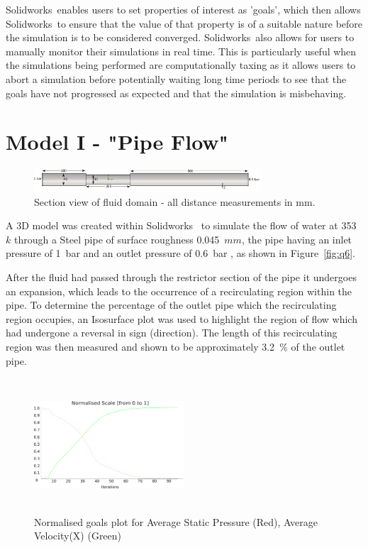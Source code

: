 \documentclass[a4paper,11pt,onecolumn]{article}
\begin{document}
Solidworks\textregistered~enables users to set properties of interest as
'goals', which then allows Solidworks\textregistered~to ensure that the value
of
that property is of a suitable nature before the simulation is to be considered
converged. Solidworks\textregistered~also allows for users to manually monitor
their simulations in real time. This is particularly useful when the
simulations being performed are computationally taxing as it allows users to
abort a simulation before potentially waiting long time periods to see that the
goals have not progressed as expected and that the simulation is misbehaving. 
\section{Model I - "Pipe Flow"}

\begin{figure}[ht!]
\centering
    	\includegraphics[width=0.75\textwidth]{q6.pdf}
    	\caption{Section view of fluid domain - all distance measurements in mm.}
\label{fig:q6}
\end{figure}
A 3D model was created within Solidworks\textregistered~ to simulate the flow
of water at 353~$k$ through a Steel pipe of surface roughness 0.045~$mm$, the
pipe having an inlet pressure of 1~bar and an outlet pressure of 0.6~bar , as
shown in Figure~\vref{fig:q6}.


After the fluid had passed through the restrictor section of the pipe it
undergoes an expansion, which leads to the occurrence of a recirculating region
within the pipe. To determine the percentage of the
outlet pipe which the recirculating region occupies, an Isosurface plot was
used to highlight the region of flow which had undergone a reversal in
sign (direction). The length of this recirculating region was then measured and
shown to be approximately 3.2~$\%$ of the outlet pipe.

\begin{figure}
\centering
    	\includegraphics[height=5cm,width=0.5\textwidth]{q7.pdf}
    	\caption{Normalised goals plot for Average Static Pressure (Red), Average
Velocity(X) (Green)}
\label{fig:q13}
\end{figure}
\end{document}
